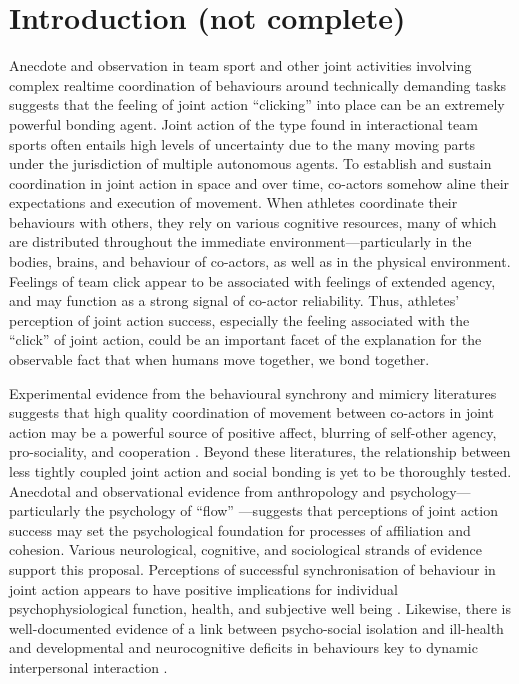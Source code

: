 \section{Introduction (not complete)}
Anecdote and observation in team sport and other joint activities involving complex realtime coordination of behaviours around technically demanding tasks suggests that
the feeling of joint action ``clicking'' into place can be an extremely powerful bonding agent. Joint action of the type found in interactional team sports often entails high levels of uncertainty due to the many moving parts under the jurisdiction of multiple autonomous agents.  To establish and sustain coordination in joint action in space and over time, co-actors somehow aline their expectations and execution of movement. When athletes coordinate their behaviours with others, they rely on various cognitive resources, many of which are distributed throughout the immediate environment---particularly in the bodies, brains, and behaviour of co-actors, as well as in the physical environment.  Feelings of team click appear to be associated with feelings of extended agency, and may function as a strong signal of co-actor reliability.  Thus, athletes' perception of joint action success, especially the feeling associated with the ``click'' of joint action, could be an important facet of the explanation for the observable fact that when humans move together, we bond together.

Experimental evidence from the behavioural synchrony and mimicry literatures suggests that high quality coordination of movement between co-actors in joint action may be a powerful source of positive affect, blurring of self-other agency, pro-sociality, and cooperation \citep{Mogan2017}. Beyond these literatures, the relationship between less tightly coupled joint action and social bonding is yet to be thoroughly tested.  Anecdotal and observational evidence from anthropology and psychology---particularly the psychology of ``flow'' \citep{Csikszentmihalyi1992,Jackson1999}---suggests that perceptions of joint action success may set the psychological foundation for processes of affiliation and cohesion.  Various neurological, cognitive, and sociological strands of evidence support this proposal.  Perceptions of successful synchronisation of behaviour in joint action appears to have positive implications for individual psychophysiological function, health, and subjective well being \citep{Wheatley2012}.  Likewise, there is well-documented evidence of a link between psycho-social isolation and ill-health and developmental and neurocognitive deficits in behaviours key to dynamic interpersonal interaction \citep[e.g.][]{Blakemore2005,Baron-Cohen1991}.

